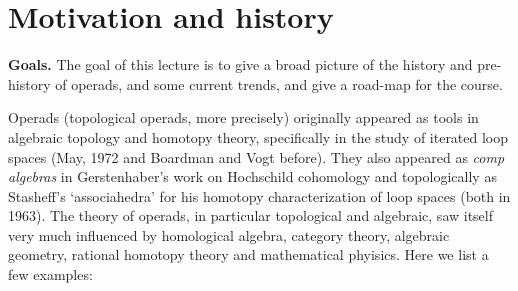 

\section{Motivation and history}\label{lecture:theintro}
 
\textbf{Goals.} The goal of this lecture is to give a broad picture of the 
history and pre-history of operads, and some current trends, and give a road-map
for the course.  
  
Operads (topological operads, more precisely) originally appeared as tools in 
algebraic topology and homotopy theory, specifically in the study of iterated loop 
spaces (May, 1972 and Boardman and Vogt before). They also appeared as \emph{comp 
algebras} in Gerstenhaber's work on Hochschild cohomology and topologically as 
Stasheff's `associahedra' for his homotopy characterization of loop spaces (both 
in 1963). The theory of operads, in particular topological and algebraic, saw 
itself very much influenced by homological algebra, category theory, algebraic
geometry, rational homotopy theory and mathematical phyisics. Here we list a few 
examples:

